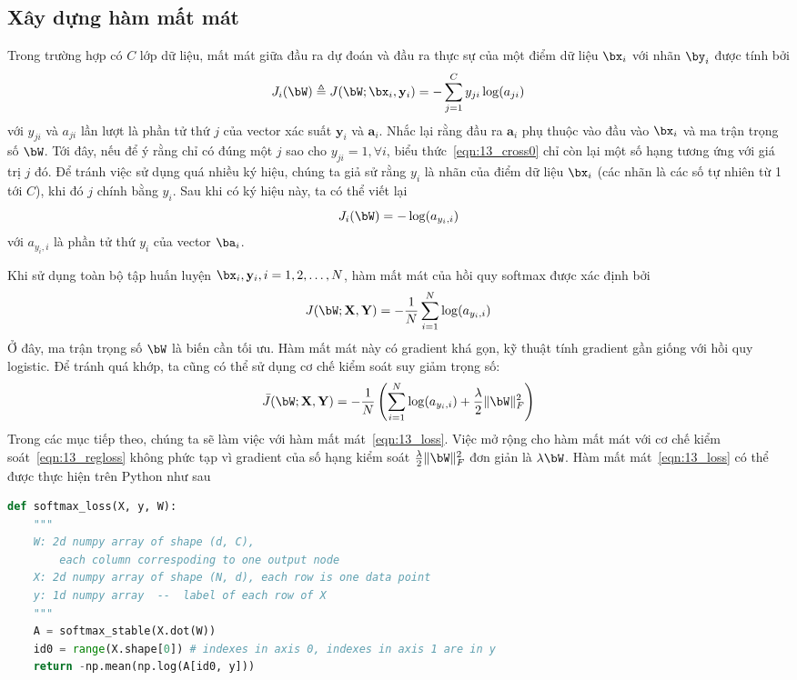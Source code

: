 \subsection{Xây dựng hàm mất mát} 
Trong trường hợp có $C$ lớp dữ liệu, {mất mát} giữa
đầu ra dự đoán và đầu ra thực sự của một điểm dữ liệu $\bx_i$ với
nhãn $\by_i$ được tính bởi
\begin{equation} 
\label{eqn:13_cross0}
J_i(\bW) \triangleq J(\bW;\bx_i, \mathbf{y}_i) = -\sum_{j=1}^C
y_{ji}\log(a_{ji})
\end{equation} 
với $y_{ji}$ và $ a_{ji}$ lần lượt là phần tử thứ $j$ của vector xác suất
$\mathbf{y}_i$ và $\mathbf{a}_i$. Nhắc lại rằng đầu ra $\mathbf{a}_i$ phụ thuộc vào đầu vào $\bx_i$ và ma trận trọng số $\bW$. 
Tới đây, nếu để ý rằng chỉ có đúng một $j$ sao cho $y_{ji} = 1, \forall i$, biểu
thức~\eqref{eqn:13_cross0} chỉ còn lại một số hạng tương ứng với giá trị $j$ đó.
Để tránh việc sử dụng quá nhiều ký hiệu, chúng ta giả sử rằng $y_i$ là nhãn
của điểm dữ liệu $\bx_i$ (các nhãn là các số tự nhiên từ 1 tới $C$), khi đó $j$
chính bằng $y_i$. Sau khi có
ký hiệu này, ta có thể viết lại
\begin{equation}
    J_i(\bW) = - \log(a_{y_i, i})
\end{equation}
với $a_{y_i, i}$ là phần tử thứ $y_i$ của vector $\ba_i$.

Khi sử dụng toàn bộ tập huấn luyện $\bx_i, \mathbf{y}_i, i = 1, 2, \dots, N$,
hàm mất mát của hồi quy softmax được xác định bởi
\begin{equation} 
\label{eqn:13_loss}
J(\bW; \mathbf{X}, \mathbf{Y}) = -\frac{1}{N}\sum_{i = 1}^N
\log(a_{y_i,i})
\end{equation} 
Ở đây, ma trận trọng số $\bW$ là biến cần tối ưu. Hàm mất mát này có gradient khá
gọn, kỹ thuật tính gradient gần giống với hồi quy logistic. Để tránh quá khớp, ta cũng có thể sử dụng cơ chế kiểm soát suy giảm trọng số:
\begin{equation}
\label{eqn:13_regloss}
     \bar{J}(\bW; \mathbf{X}, \mathbf{Y}) =
     -\frac{1}{N}\left(\sum_{i = 1}^N \log(a_{y_i,i}) + \frac{\lambda}{2} \|\bW\|_F^2 \right)
 \end{equation}
Trong các mục tiếp theo, chúng ta sẽ làm việc với hàm mất
mát~\eqref{eqn:13_loss}. Việc mở rộng cho hàm mất mát với
cơ chế kiểm soát~\eqref{eqn:13_regloss} không phức tạp vì gradient của số hạng
kiểm soát $\frac{\lambda}{2}\|\bW\|_F^2$ đơn giản là $\lambda \bW$. Hàm mất
mát~\eqref{eqn:13_loss} có thể được thực hiện trên Python như sau
\begin{lstlisting}[language=Python]
def softmax_loss(X, y, W):
    """
    W: 2d numpy array of shape (d, C), 
        each column correspoding to one output node
    X: 2d numpy array of shape (N, d), each row is one data point
    y: 1d numpy array  --  label of each row of X 
    """
    A = softmax_stable(X.dot(W))
    id0 = range(X.shape[0]) # indexes in axis 0, indexes in axis 1 are in y
    return -np.mean(np.log(A[id0, y]))
\end{lstlisting}


